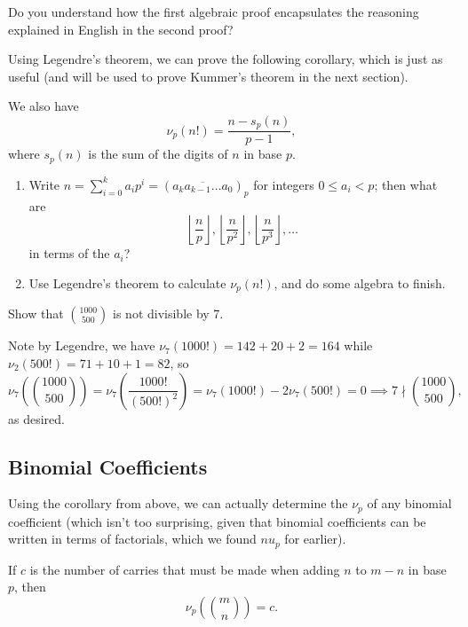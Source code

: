 \documentclass{article}
\begin{document}
\begin{remark}
    Do you understand how the first algebraic proof encapsulates the reasoning explained in English in the second proof?
\end{remark}

Using Legendre's theorem, we can prove the following corollary, which is just as useful (and will be used to prove Kummer's theorem in the next section).

\begin{corollary}
    We also have \[\nu_p(n!)=\frac{n-s_p(n)}{p-1},\] where $s_p(n)$ is the sum of the digits of $n$ in base $p$.
\end{corollary}

\begin{walk}
    \begin{enumerate}
        \item Write $n=\sum_{i=0}^k a_ip^i=\left( \overline{a_ka_{k-1}\dots a_0} \right)_p$ for integers $0\leq a_i<p$; then what are \[\left\lfloor \frac np \right\rfloor,\left\lfloor \frac n{p^2} \right\rfloor,\left\lfloor \frac n{p^3} \right\rfloor,\dots\] in terms of the $a_i$?
        \item Use Legendre's theorem to calculate $\nu_p(n!)$, and do some algebra to finish.
    \end{enumerate}
\end{walk}

\begin{exam}
    Show that $\binom{1000}{500}$ is not divisible by 7.
\end{exam}

\begin{sol}
    Note by Legendre, we have $\nu_7(1000!)=142+20+2=164$ while $\nu_2(500!)=71+10+1=82$, so \[\nu_7\left( \binom{1000}{500} \right)=\nu_7\left( \frac{1000!}{(500!)^2} \right)=\nu_7(1000!)-2\nu_7(500!)=0\implies 7\nmid \binom{1000}{500},\] as desired.
\end{sol}

\subsection{Binomial Coefficients}
Using the corollary from above, we can actually determine the $\nu_p$ of any binomial coefficient (which isn't too surprising, given that binomial coefficients can be written in terms of factorials, which we found $nu_p$ for earlier).

\begin{theo}[Kummer]
    If $c$ is the number of carries that must be made when adding $n$ to $m-n$ in base $p$, then \[\nu_p\left( \binom mn \right)=c.\]
\end{theo}
\end{document}
